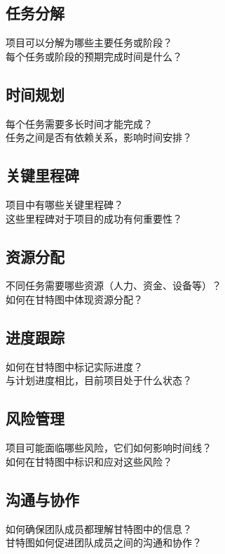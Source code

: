 \documentclass[12pt]{book}
\begin{document}
\subsection{任务分解}
项目可以分解为哪些主要任务或阶段？\\
每个任务或阶段的预期完成时间是什么？\\

\subsection{时间规划}
每个任务需要多长时间才能完成？\\
任务之间是否有依赖关系，影响时间安排？\\

\subsection{关键里程碑}
项目中有哪些关键里程碑？\\
这些里程碑对于项目的成功有何重要性？\\

\subsection{资源分配}
不同任务需要哪些资源（人力、资金、设备等）？\\
如何在甘特图中体现资源分配？\\

\subsection{进度跟踪}
如何在甘特图中标记实际进度？\\
与计划进度相比，目前项目处于什么状态？\\

\subsection{风险管理}
项目可能面临哪些风险，它们如何影响时间线？\\
如何在甘特图中标识和应对这些风险？\\

\subsection{沟通与协作}
如何确保团队成员都理解甘特图中的信息？\\
甘特图如何促进团队成员之间的沟通和协作？\\
\end{document}
